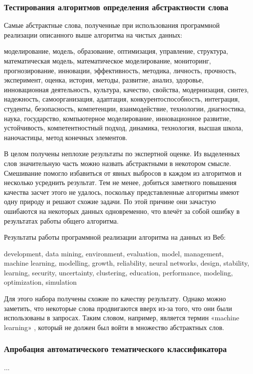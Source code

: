 \subsubsection{Тестирования алгоритмов определения абстрактности слова}
Самые абстрактные слова, полученные при использования программной реализации
описанного выше алгоритма на чистых данных:

моделирование, модель, образование, оптимизация, управление, структура, математическая модель, математическое моделирование, мониторинг, прогнозирование, инновации, эффективность, методика, личность, прочность, эксперимент, оценка, история, методы, развитие, анализ, здоровье, инновационная деятельность, культура, качество, свойства, модернизация, синтез, надежность, самоорганизация, адаптация, конкурентоспособность, интеграция, студенты, безопасность, компетенции, взаимодействие, технологии, диагностика, наука, государство, компьютерное моделирование, инновационное развитие, устойчивость, компетентностный подход, динамика, технология, высшая школа, наночастицы, метод конечных элементов.

В целом получены неплохие результаты по экспертной оценке. Из выделенных слов значительную часть можно назвать абстрактными в некотором смысле. Смешивание помогло избавиться от явных выбросов в каждом из алгоритмов и несколько усреднить результат. Тем не менее, добиться заметного повышения качества засчет этого не удалось, поскольку представленные алгоритмы имеют одну природу и решают схожие задачи. По этой причине они зачастую ошибаются на некоторых данных одновременно, что влечёт за собой ошибку в результатах работы общего алгоритма.

Результаты работы программной реализации алгоритма на данных из Веб:

development, data mining, environment, evaluation, model, management, machine learning, modelling, growth, reliability, neural networks, design, stability, learning, security, uncertainty, clustering, education, performance, modeling, optimization, simulation

Для этого набора получены схожие по качеству результату. Однако можно заметить, что некоторые слова продвигаются вверх из-за того, что они были использованы в запросах. Таким словом, например, является термин «machine learning» , который не должен был войти в множество абстрактных слов.

\subsubsection{Апробация автоматического тематического классификатора}
...

